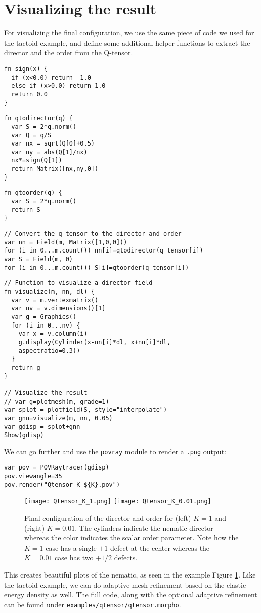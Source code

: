 \documentclass{article}
\begin{document}
\section{Visualizing the result}
For visualizing the final configuration, we use the same piece of code we used for the tactoid example, and define some additional helper functions to extract the director and the order from the Q-tensor.
\begin{lstlisting}
fn sign(x) {
  if (x<0.0) return -1.0
  else if (x>0.0) return 1.0
  return 0.0
}
\end{lstlisting}
\begin{lstlisting}
fn qtodirector(q) {
  var S = 2*q.norm()
  var Q = q/S
  var nx = sqrt(Q[0]+0.5)
  var ny = abs(Q[1]/nx)
  nx*=sign(Q[1])
  return Matrix([nx,ny,0])
}
\end{lstlisting}
\begin{lstlisting}
fn qtoorder(q) {
  var S = 2*q.norm()
  return S
}
\end{lstlisting}
\begin{lstlisting}
// Convert the q-tensor to the director and order
var nn = Field(m, Matrix([1,0,0]))
for (i in 0...m.count()) nn[i]=qtodirector(q_tensor[i])
var S = Field(m, 0)
for (i in 0...m.count()) S[i]=qtoorder(q_tensor[i])
\end{lstlisting}
\begin{lstlisting}
// Function to visualize a director field
fn visualize(m, nn, dl) {
  var v = m.vertexmatrix()
  var nv = v.dimensions()[1]
  var g = Graphics()
  for (i in 0...nv) {
    var x = v.column(i)
    g.display(Cylinder(x-nn[i]*dl, x+nn[i]*dl,
    aspectratio=0.3))
  }
  return g
}

// Visualize the result
// var g=plotmesh(m, grade=1)
var splot = plotfield(S, style="interpolate")
var gnn=visualize(m, nn, 0.05)
var gdisp = splot+gnn
Show(gdisp)
\end{lstlisting}
We can go further and use the \texttt{povray} module to render a \texttt{.png} output:
\begin{lstlisting}
var pov = POVRaytracer(gdisp)
pov.viewangle=35
pov.render("Qtensor_K_${K}.pov")
\end{lstlisting}
\begin{figure}
    \centering
    \texttt{[image: Qtensor\_K\_1.png]}
    \texttt{[image: Qtensor\_K\_0.01.png]}
    \caption{Final configuration of the director and order for (left) $K=1$ and (right) $K=0.01$. The cylinders indicate the nematic director whereas the color indicates the scalar order parameter. Note how the $K=1$ case has a single $+1$ defect at the center whereas the $K=0.01$ case has two $+1/2$ defects.}
    \label{fig:qtensor}
\end{figure}
This creates beautiful plots of the nematic, as seen in the example Figure \ref{fig:qtensor}. 
Like the tactoid example, we can do adaptive mesh refinement based on the elastic energy density as well. The full code, along with the optional adaptive refinement can be found under \texttt{examples/qtensor/qtensor.morpho}.
\end{document}

